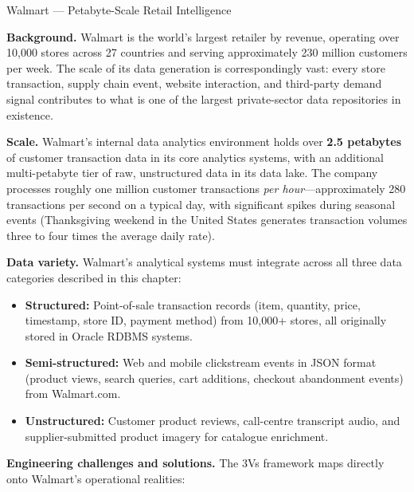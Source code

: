\begin{casestudy}{Walmart --- Petabyte-Scale Retail Intelligence}

\textbf{Background.}
Walmart is the world's largest retailer by revenue, operating over
10,000 stores across 27 countries and serving approximately 230 million
customers per week. The scale of its data generation is correspondingly
vast: every store transaction, supply chain event, website interaction,
and third-party demand signal contributes to what is one of the largest
private-sector data repositories in existence.

\smallskip
\textbf{Scale.}
Walmart's internal data analytics environment holds over \textbf{2.5
petabytes} of customer transaction data in its core analytics systems,
with an additional multi-petabyte tier of raw, unstructured data in its
data lake. The company processes roughly one million customer
transactions \emph{per hour}---approximately 280 transactions per second
on a typical day, with significant spikes during seasonal events
(Thanksgiving weekend in the United States generates transaction volumes
three to four times the average daily rate).

\smallskip
\textbf{Data variety.}
Walmart's analytical systems must integrate across all three data
categories described in this chapter:
\begin{itemize}
  \item \textbf{Structured:} Point-of-sale transaction records
        (item, quantity, price, timestamp, store ID, payment method)
        from 10,000+ stores, all originally stored in Oracle RDBMS systems.
  \item \textbf{Semi-structured:} Web and mobile clickstream events in
        JSON format (product views, search queries, cart additions,
        checkout abandonment events) from Walmart.com.
  \item \textbf{Unstructured:} Customer product reviews, call-centre
        transcript audio, and supplier-submitted product imagery for
        catalogue enrichment.
\end{itemize}

\smallskip
\textbf{Engineering challenges and solutions.}
The 3Vs framework maps directly onto Walmart's operational realities:


\end{casestudy}
